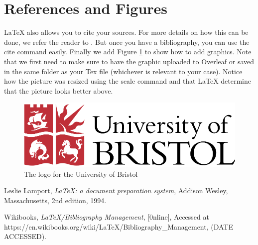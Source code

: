 \documentclass[a4paper,11pt]{article}
\theoremstyle{definition}
\begin{document}
\section{References and Figures}
\LaTeX{} \cite{lamport94} also allows you to cite your sources. For more details on how this can be done, we refer the reader to \cite[sec:~Embedded System]{referencing}. But once you have a bibliography, you can use the cite command easily. Finally we add Figure \ref{fig:logo} to show how to add graphics. Note that we first need to make sure to have the graphic uploaded to Overleaf  or saved in the same folder as your Tex file (whichever is relevant to your case). Notice how the picture was resized using the scale command and that \LaTeX{} determine that the picture looks better above.

\begin{figure}
    \centering
    \includegraphics[scale=0.6]{uob.pdf}
    \caption{The logo for the University of Bristol}
    \label{fig:logo}
\end{figure}


\begin{thebibliography}{99}

  Leslie Lamport,
  \textit{\LaTeX: a document preparation system},
  Addison Wesley, Massachusetts,
  2nd edition,
  1994.
  
    Wikibooks,
    \textit{\LaTeX/Bibliography Management},
    [0nline],
    Accessed at https://en.wikibooks.org/wiki/LaTeX/Bibliography\_Management,
    (DATE ACCESSED).
    

\end{thebibliography}
\end{document}
